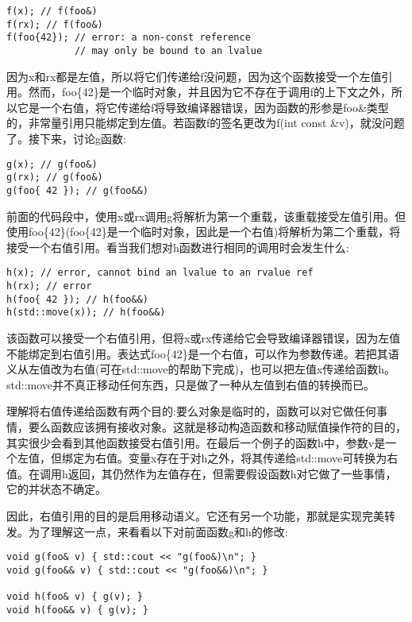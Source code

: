 \begin{lstlisting}[style=styleCXX]
f(x); // f(foo&)
f(rx); // f(foo&)
f(foo{42}); // error: a non-const reference
            // may only be bound to an lvalue
\end{lstlisting}

因为x和rx都是左值，所以将它们传递给f没问题，因为这个函数接受一个左值引用。然而，foo\{42\}是一个临时对象，并且因为它不存在于调用f的上下文之外，所以它是一个右值，将它传递给f将导致编译器错误，因为函数的形参是foo\&类型的，非常量引用只能绑定到左值。若函数f的签名更改为f(int const \&v)，就没问题了。接下来，讨论g函数:

\begin{lstlisting}[style=styleCXX]
g(x); // g(foo&)
g(rx); // g(foo&)
g(foo{ 42 }); // g(foo&&)
\end{lstlisting}

前面的代码段中，使用x或rx调用g将解析为第一个重载，该重载接受左值引用。但使用foo\{42\}(foo\{42\}是一个临时对象，因此是一个右值)将解析为第二个重载，将接受一个右值引用。看当我们想对h函数进行相同的调用时会发生什么:

\begin{lstlisting}[style=styleCXX]
h(x); // error, cannot bind an lvalue to an rvalue ref
h(rx); // error
h(foo{ 42 }); // h(foo&&)
h(std::move(x)); // h(foo&&)
\end{lstlisting}

该函数可以接受一个右值引用，但将x或rx传递给它会导致编译器错误，因为左值不能绑定到右值引用。表达式foo\{42\}是一个右值，可以作为参数传递。若把其语义从左值改为右值(可在std::move的帮助下完成)，也可以把左值x传递给函数h。std::move并不真正移动任何东西，只是做了一种从左值到右值的转换而已。

理解将右值传递给函数有两个目的:要么对象是临时的，函数可以对它做任何事情，要么函数应该拥有接收对象。这就是移动构造函数和移动赋值操作符的目的，其实很少会看到其他函数接受右值引用。在最后一个例子的函数h中，参数v是一个左值，但绑定为右值。变量x存在于对h之外，将其传递给std::move可转换为右值。在调用h返回，其仍然作为左值存在，但需要假设函数h对它做了一些事情，它的并状态不确定。

因此，右值引用的目的是启用移动语义。它还有另一个功能，那就是实现完美转发。为了理解这一点，来看看以下对前面函数g和h的修改:

\begin{lstlisting}[style=styleCXX]
void g(foo& v) { std::cout << "g(foo&)\n"; }
void g(foo&& v) { std::cout << "g(foo&&)\n"; }

void h(foo& v) { g(v); }
void h(foo&& v) { g(v); }
\end{lstlisting}

